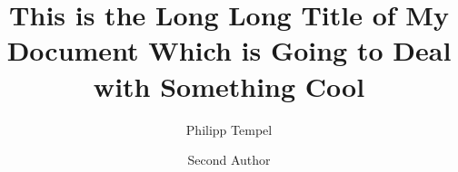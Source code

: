 \documentclass[%
  draft,%
  oneside,%
  ngerman,%
  english,%
]{iswartcl}
\author{Philipp Tempel \and Second Author}
\date{\printdate{2017-10-02}}
\title{This is the Long Long Title of My Document Which is Going to Deal with Something Cool}
\begin{document}
\frontmatter



\maketitle



\begin{abstract}
  \Blindtext[2][1]
\end{abstract}




\tableofcontents

\listoffigures

\listoftables





\mainmatter








\end{document}
